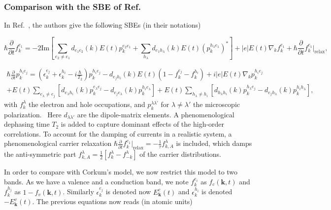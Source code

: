 \documentclass[a4paper,11pt]{report}
\renewcommand{\vec}[1]{\mathbf{#1}}
\begin{document}
\subsubsection{Comparison with the SBE of Ref.~\cite{hohenleutner2015real}}

In  Ref.~\cite{hohenleutner2015real}, the authors give the following SBEs (in their notations)

\begin{equation}
 \hbar\frac{\partial}{\partial t} f^{e_1}_k = -2\mathrm{Im}\left[ \sum_{e_2\neq e_1}d_{e_1e_2}(k)E(t)p_{k}^{e_2e_1} + \sum_{h_\lambda}  d_{e_1h_\lambda}(k)E(t)(p_k^{h_\lambda e_1})^*\right] + |e|E(t)\nabla_k f_k^{e_1} + \hbar \frac{\partial}{\partial t} f_{k}^{e_1}|_{\mathrm{relax}},
\end{equation}

\begin{eqnarray}
 \hbar\frac{\partial}{\partial t} p^{h_ie_j}_k = \left( \epsilon_k^{e_j} + \epsilon_k^{h_i} - i\frac{\hbar}{T_2} \right) p_{k}^{h_ie_j} - d_{e_jh_i}(k)E(t)\left(1-f_{k}^{e_j}-f_k^{h_i}\right)
 + i|e|E(t)\nabla_kp_k^{h_ie_j} \nonumber\\
  + E(t)\sum_{e_\lambda\neq e_j} [d_{e_\lambda h_i}(k)p_{k}^{e_\lambda e_j} - d_{e_je_\lambda}(k)p_{k}^{h_ie_\lambda}]
  + E(t)\sum_{h_\lambda\neq h_i} [d_{h_\lambda h_i}(k)p_{k}^{h_\lambda e_j} - d_{e_jh_\lambda}(k)p_{k}^{h_ih_\lambda}],
\end{eqnarray}
 with $f_k^\lambda$ the electron and hole occupations, and $p_k^{\lambda\lambda'}$ for $\lambda\neq\lambda'$ the microscopic polarization.~\cite{hohenleutner2015real} Here $d_{\lambda\lambda'}$ are the dipole-matrix elements.
 A phenomenological dephasing time $T_2$ is added to capture dominant effects of the high-order correlations. To account for the damping of currents in a realistic system, a phenomenological carrier relaxation $ \hbar \frac{\partial}{\partial t} f_{k}^{e_1}|_{\mathrm{relax}} = -\frac{1}{\tau}f_{k,A}^\lambda$ is included, which damps the anti-symmetric part $f_{k,A}^\lambda = \frac{1}{2}[f_k^{\lambda}-f_{-k}^{\lambda}]$ of the carrier distributions.~\cite{hohenleutner2015real}

 In order to compare with Corkum's model, we now restrict this model to two bands. As we have a valence and a conduction band, we note $f_k^{e_i}$ as  $f_c(\vec{k},t)$ and $f_k^{h_j}$ as $1-f_v(\vec{k},t)$. Similarly $\epsilon_k^{e_j}$ is denoted now $E_\vec{k}^c(t)$ and $\epsilon_k^{h_i}$ is denoted $-E_\vec{k}^v(t)$.
 The previous equations now reads (in atomic units)
 
\end{document}
